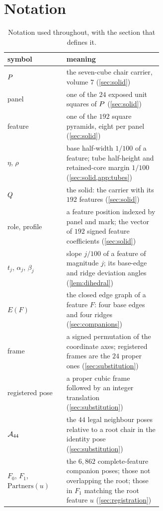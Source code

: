 \section{Notation}\label{app:notation}

\begin{table}[ht]
  \centering
  \caption{Notation used throughout, with the section that defines it.}
  \label{tab:notation}
  \small
  \begin{tabular}{l L{0.62\linewidth}}
    \toprule
    symbol & meaning \\
    \midrule
    $P$ & the seven-cube chair carrier, volume $7$ (\cref{sec:solid}) \\
    panel & one of the $24$ exposed unit squares of $P$ (\cref{sec:solid}) \\
    feature & one of the $192$ square pyramids, eight per panel (\cref{sec:solid}) \\
    $\eta$, $\rho$ & base half-width $1/100$ of a feature; tube half-height and retained-core margin $1/100$ (\cref{sec:solid,app:tubes}) \\
    $Q$ & the solid: the carrier with its $192$ features (\cref{sec:solid}) \\
    role, profile & a feature position indexed by panel and mark; the vector of $192$ signed feature coefficients (\cref{sec:solid}) \\
    $t_j$, $\alpha_j$, $\beta_j$ & slope $j/100$ of a feature of magnitude $j$; its base-edge and ridge deviation angles (\cref{lem:dihedral}) \\
    $E(F)$ & the closed edge graph of a feature $F$: four base edges and four ridges (\cref{sec:companions}) \\
    frame & a signed permutation of the coordinate axes; registered frames are the $24$ proper ones (\cref{sec:substitution}) \\
    registered pose & a proper cubic frame followed by an integer translation (\cref{sec:substitution}) \\
    $\mathcal{A}_{44}$ & the $44$ legal neighbour poses relative to a root chair in the identity pose (\cref{sec:substitution}) \\
    $F_0$, $F_1$, $\mathrm{Partners}(u)$ & the $6{,}862$ complete-feature companion poses; those not overlapping the root; those in $F_1$ matching the root feature $u$ (\cref{sec:registration}) \\

\end{tabular}
\end{table}
